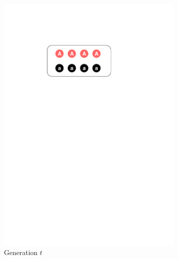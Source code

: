 \documentclass[conference]{IEEEtran}
\begin{document}
\begin{figure}[t!]
	\centering
	\begin{subfigure}[b]{.24\textwidth}
		\includegraphics[width=\linewidth]{Section2/Generation_t}
		\caption{Generation $t$}
	\end{subfigure}
	\begin{subfigure}[b]{.24\textwidth}

\end{subfigure}
\end{figure}
\end{document}
